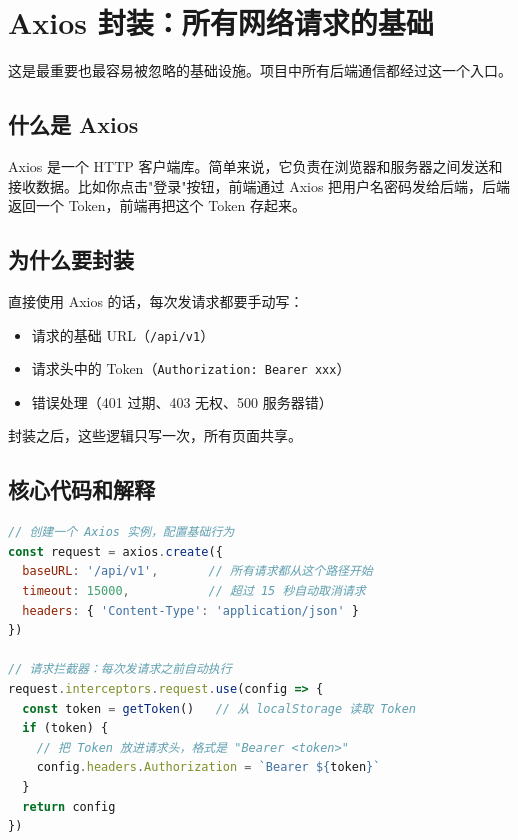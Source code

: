 \documentclass[12pt,a4paper]{ctexart}
\begin{document}
\section{Axios 封装：所有网络请求的基础}

这是最重要也最容易被忽略的基础设施。项目中所有后端通信都经过这一个入口。

\subsection{什么是 Axios}

Axios 是一个 HTTP 客户端库。简单来说，它负责在浏览器和服务器之间发送和接收数据。比如你点击"登录"按钮，前端通过 Axios 把用户名密码发给后端，后端返回一个 Token，前端再把这个 Token 存起来。

\subsection{为什么要封装}

直接使用 Axios 的话，每次发请求都要手动写：
\begin{itemize}
  \item 请求的基础 URL（\texttt{/api/v1}）
  \item 请求头中的 Token（\texttt{Authorization: Bearer xxx}）
  \item 错误处理（401 过期、403 无权、500 服务器错）
\end{itemize}

封装之后，这些逻辑只写一次，所有页面共享。

\subsection{核心代码和解释}

\begin{lstlisting}[language=JavaScript]
// 创建一个 Axios 实例，配置基础行为
const request = axios.create({
  baseURL: '/api/v1',       // 所有请求都从这个路径开始
  timeout: 15000,           // 超过 15 秒自动取消请求
  headers: { 'Content-Type': 'application/json' }
})

// 请求拦截器：每次发请求之前自动执行
request.interceptors.request.use(config => {
  const token = getToken()   // 从 localStorage 读取 Token
  if (token) {
    // 把 Token 放进请求头，格式是 "Bearer <token>"
    config.headers.Authorization = `Bearer ${token}`
  }
  return config
})
\end{lstlisting}
\end{document}
